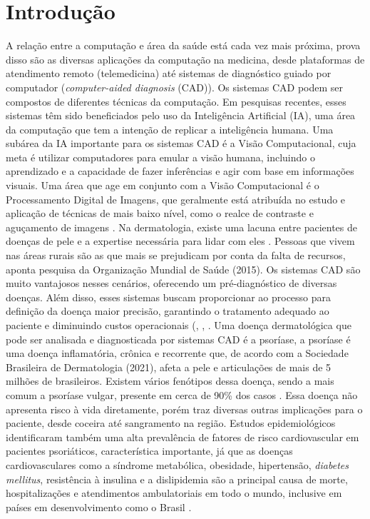 \section{Introdução}
A relação entre a computação e área da saúde está cada vez mais próxima, prova disso são as diversas aplicações da computação na medicina, desde plataformas de atendimento remoto (telemedicina) até sistemas de diagnóstico guiado por computador (\textit{computer-aided diagnosis} (CAD)).
Os sistemas CAD podem ser compostos de diferentes técnicas da computação. Em pesquisas recentes, esses sistemas têm sido beneficiados pelo uso da Inteligência Artificial (IA), uma área da computação que tem a intenção de replicar a inteligência humana. Uma subárea da IA importante para os sistemas CAD é a Visão Computacional, cuja meta é utilizar computadores para emular a visão humana, incluindo o aprendizado e a capacidade de fazer inferências e agir com base em informações visuais. Uma área que age em conjunto com a Visão Computacional é o Processamento Digital de Imagens, que geralmente está atribuída no estudo e aplicação de técnicas de mais baixo nível, como o realce de contraste e aguçamento de imagens \cite{gonzalez2008digital}.
Na dermatologia, existe uma lacuna entre pacientes de doenças de pele e a expertise necessária para lidar com eles \cite{Hameed2019}. Pessoas que vivem nas áreas rurais são as que mais se prejudicam por conta da falta de recursos, aponta pesquisa da Organização Mundial de Saúde (2015). Os sistemas CAD são muito vantajosos nesses cenários, oferecendo um pré-diagnóstico de diversas doenças. Além disso, esses sistemas buscam proporcionar ao processo para definição da doença maior precisão, garantindo o tratamento adequado ao paciente e diminuindo custos operacionais (\cite{Hameed2019}, \cite{DAS2020119556}, \cite{Arora2021}. Uma doença dermatológica que pode ser analisada e diagnosticada por sistemas CAD é a psoríase, a psoríase é uma doença inflamatória, crônica e recorrente que, de acordo com a Sociedade Brasileira de Dermatologia (2021), afeta a pele e articulações de mais de 5 milhões de brasileiros. Existem vários fenótipos dessa doença, sendo a mais comum a psoríase vulgar, presente em cerca de 90\% dos casos \cite{Griffiths2007}. Essa doença não apresenta risco à vida diretamente, porém traz diversas outras implicações para o paciente, desde coceira até sangramento na região. Estudos epidemiológicos identificaram também uma alta prevalência de fatores de risco cardiovascular em pacientes psoriáticos, característica importante, já que as doenças cardiovasculares como a síndrome metabólica, obesidade, hipertensão, \textit{diabetes mellitus}, resistência à insulina e a dislipidemia \cite{Miller2013} são a principal causa de morte, hospitalizações e atendimentos ambulatoriais em todo o mundo, inclusive em países em desenvolvimento como o Brasil \cite{Barroso2021}. 
